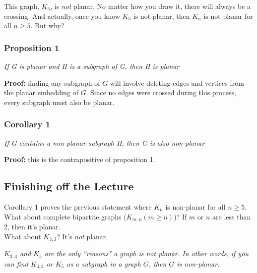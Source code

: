 \documentclass{report}
\begin{document}
This graph, $K_5$, is \textit{not} planar. No matter how you draw it, there will always be a crossing. And actually, once you know $K_5$ is not planar, then $K_n$ is not planar for all $n \geq 5$. But why?
\subsubsection{Proposition 1}
\begin{center}
\textit{If G is planar and H is a subgraph of G, then H is planar}
\end{center}
\textbf{Proof:} finding any subgraph of $G$ will involve deleting edges and vertices from the planar embedding of $G$. Since no edges were crossed during this process, every subgraph must also be planar.
\subsubsection{Corollary 1}
\begin{center}
\textit{If G contains a non-planar subgraph H, then G is also non-planar}
\end{center}
\textbf{Proof:} this is the contrapositive of proposition 1.
\subsection{Finishing off the Lecture}
Corollary 1 proves the previous statement where $K_n$ is non-planar for all $n \geq 5$.\\
What about complete bipartite graphs ($K_{m,n}(m  \geq n)$)?
If $m$ or $n$ are less than 2, then it's planar.\\
What about $K_{3, 3}$? It's \textit{not} planar.
\begin{center}
\textit{$K_{3,3}$ and $K_5$ are the only ``reasons" a graph is not planar. In other words, if you can find $K_{3,3}$ or $K_5$ as a subgraph in a graph $G$, then $G$ is non-planar.}
\end{center}
\end{document}

